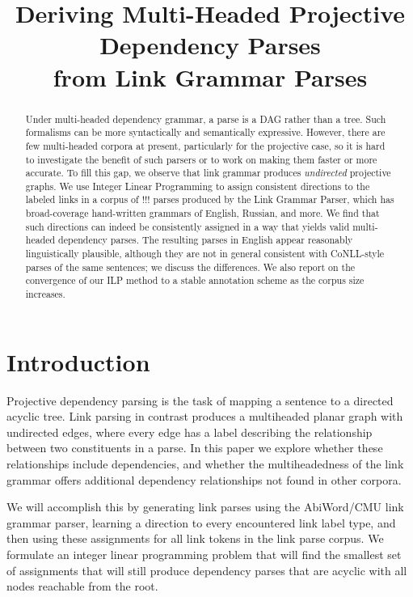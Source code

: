 \documentclass[11pt]{article}
\title{Deriving Multi-Headed Projective Dependency Parses \\ from Link Grammar Parses}
\date{}
\newcommand{\Note}[4][]{\todo[author=#2,color=#3,fancyline,#1]{#4}}
\newcommand{\noteJE}[2][]{\Note[#1]{JE}{green!40}{#2}}
\begin{document}
\maketitle

\begin{abstract}
Under multi-headed dependency grammar, a parse is a DAG rather than a tree.  Such formalisms can be more syntactically and semantically expressive.  However, there are few multi-headed corpora at present, particularly for the projective case, so it is hard to investigate the benefit of such parsers or to work on making them faster or more accurate.  To fill this gap, we observe that link grammar produces {\em undirected} projective graphs.  
We use Integer Linear Programming to assign consistent directions to the labeled links in a corpus of !!! \noteJE{fill in the number} parses produced by the Link Grammar Parser, which has broad-coverage hand-written grammars of English, Russian, and more. \noteJE{what statistics does it use?} We find that such directions can indeed be consistently assigned in a way that yields valid multi-headed dependency parses. The resulting parses in English appear reasonably linguistically plausible, although they are not in general consistent with CoNLL-style parses of the same sentences; we discuss the differences.  We also report on the convergence of our ILP method to a stable annotation scheme as the corpus size increases.
\end{abstract}


\section{Introduction}
Projective dependency parsing is the task of mapping a sentence to a directed acyclic tree. Link parsing in contrast produces a multiheaded planar graph with undirected edges, where every edge has a label describing the relationship between two constituents in a parse. In this paper we explore whether these relationships include dependencies, and whether the multiheadedness of the link grammar offers additional dependency relationships not found in other corpora.

We will accomplish this by generating link parses using the AbiWord/CMU link grammar parser, learning a direction to every encountered link label type, and then using these assignments for all link tokens in the link parse corpus. We formulate an integer linear programming problem that will find the smallest set of assignments that will still produce dependency parses that are acyclic with all nodes reachable from the root.
\end{document}
